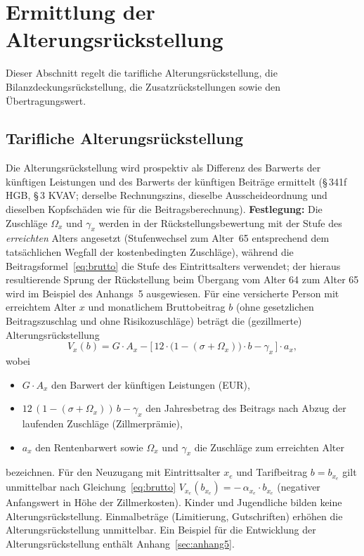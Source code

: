 \section{Ermittlung der Alterungsrückstellung}\label{sec:ar}

Dieser Abschnitt regelt die tarifliche Alterungsrückstellung, die
Bilanzdeckungsrückstellung, die Zusatzrückstellungen sowie den
Übertragungswert.

\subsection{Tarifliche Alterungsrückstellung}\label{sec:tarifar}

Die Alterungsrückstellung wird prospektiv als Differenz des Barwerts
der künftigen Leistungen und des Barwerts der künftigen Beiträge
ermittelt (\S\,341f HGB, \S\,3 KVAV; derselbe Rechnungszins, dieselbe
Ausscheideordnung und dieselben Kopfschäden wie für die
Beitragsberechnung). \textbf{Festlegung:} Die Zuschläge $\Omega_x$ und
$\gamma_x$ werden in der Rückstellungsbewertung mit der Stufe des
\emph{erreichten} Alters angesetzt (Stufenwechsel zum Alter~65
entsprechend dem tatsächlichen Wegfall der kostenbedingten Zuschläge),
während die Beitragsformel~\eqref{eq:brutto} die Stufe des
Eintrittsalters verwendet; der hieraus resultierende Sprung der
Rückstellung beim Übergang vom Alter 64 zum Alter 65 wird im Beispiel
des Anhangs~5 ausgewiesen. Für eine versicherte Person mit
erreichtem Alter $x$ und monatlichem Bruttobeitrag $b$ (ohne
gesetzlichen Beitragszuschlag und ohne Risikozuschläge) beträgt die
(gezillmerte) Alterungsrückstellung
\begin{equation}
V_x(b) = G\cdot A_x
- \bigl[\,12\cdot\bigl(1-(\sigma+\Omega_x)\bigr)\cdot b - \gamma_x\,\bigr]
\cdot a_x,
\label{eq:ar}
\end{equation}
wobei
\begin{itemize}\itemsep1pt
  \item $G\cdot A_x$ den Barwert der künftigen Leistungen (EUR),
  \item $12\,(1-(\sigma+\Omega_x))\,b - \gamma_x$ den Jahresbetrag des
        Beitrags nach Abzug der laufenden Zuschläge
        (\glqq Zillmerprämie\grqq),
  \item $a_x$ den Rentenbarwert sowie $\Omega_x$ und $\gamma_x$ die
        Zuschläge zum erreichten Alter
\end{itemize}
bezeichnen. Für den Neuzugang mit Eintrittsalter $x_e$ und
Tarifbeitrag $b = b_{x_e}$ gilt unmittelbar nach
Gleichung~\eqref{eq:brutto}
$V_{x_e}(b_{x_e}) = -\,\alpha_{x_e}\cdot b_{x_e}$ (negativer
Anfangswert in Höhe der Zillmerkosten). Kinder und Jugendliche bilden
keine Alterungsrückstellung. Einmalbeträge (Limitierung, Gutschriften)
erhöhen die Alterungsrückstellung unmittelbar. Ein Beispiel für die
Entwicklung der Alterungsrückstellung enthält Anhang~\ref{sec:anhang5}.

